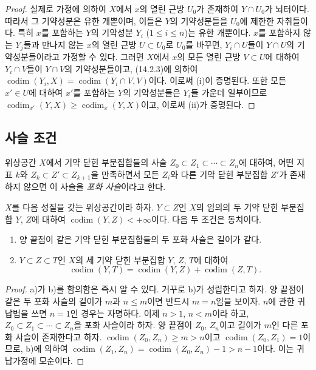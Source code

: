 \begin{proof}
실제로 가정에 의하여 $X$에서 $x$의 열린 근방 $U_0$가 존재하여
$Y\cap U_0$가 뇌터이다. 따라서 그 기약성분은 유한 개뿐이며, 이들은
$Y$의 기약성분들을 $U_0$에 제한한 자취들이다. 특히 $x$를 포함하는
$Y$의 기약성분 $Y_i$ ($1\leq i\leq n$)는 유한 개뿐이다. $x$를
포함하지 않는 $Y_j$들과 만나지 않는 $x$의 열린 근방
$U\subset U_0$로 $U_0$를 바꾸면, $Y_i\cap U$들이 $Y\cap U$의
기약성분들이라고 가정할 수 있다. 그러면 $X$에서 $x$의 모든 열린 근방
$V\subset U$에 대하여 $Y_i\cap V$들이 $Y\cap V$의 기약성분들이고,
(14.2.3)에 의하여
$\operatorname{codim}(Y_i,X)=\operatorname{codim}(Y_i\cap V,V)$이다.
이로써 (i)이 증명된다. 또한 모든 $x'\in U$에 대하여 $x'$를 포함하는
$Y$의 기약성분들은 $Y_i$들 가운데 일부이므로
$\operatorname{codim}_{x'}(Y,X)\geq\operatorname{codim}_x(Y,X)$이고,
이로써 (ii)가 증명된다.
\end{proof}

\subsection{사슬 조건}
\label{subsection:0.14.3-fr}

\begin{env}[14.3.1]
\label{0.14.3.1-fr}
위상공간 $X$에서 기약 닫힌 부분집합들의 사슬
$Z_0\subset Z_1\subset\cdots\subset Z_n$에 대하여, 어떤 지표 $k$와
$Z_k\subset Z'\subset Z_{k+1}$을 만족하면서 모든 $Z_i$와 다른 기약
닫힌 부분집합 $Z'$가 존재하지 않으면 이 사슬을 \emph{포화 사슬}이라고
한다.
\end{env}

\begin{proposition}[14.3.2]
\label{0.14.3.2-fr}
$X$를 다음 성질을 갖는 위상공간이라 하자. $Y\subset Z$인 $X$의 임의의
두 기약 닫힌 부분집합 $Y$, $Z$에 대하여
$\operatorname{codim}(Y,Z)<+\infty$이다. 다음 두 조건은 동치이다.
\begin{enumerate}
  \item[\rm(a)] 양 끝점이 같은 기약 닫힌 부분집합들의 두 포화 사슬은
  길이가 같다.
  \item[\rm(b)] $Y\subset Z\subset T$인 $X$의 세 기약 닫힌 부분집합
  $Y$, $Z$, $T$에 대하여
  \[
    \operatorname{codim}(Y,T)=
    \operatorname{codim}(Y,Z)+\operatorname{codim}(Z,T).
    \tag{14.3.2.1}\label{0.14.3.2.1-fr}
  \]
\end{enumerate}
\end{proposition}

\begin{proof}
a)가 b)를 함의함은 즉시 알 수 있다. 거꾸로 b)가 성립한다고 하자.
양 끝점이 같은 두 포화 사슬의 길이가 $m$과 $n\leq m$이면 반드시
$m=n$임을 보이자. $n$에 관한 귀납법을 쓰면 $n=1$인 경우는 자명하다.
이제 $n>1$, $n<m$이라 하고,
$Z_0\subset Z_1\subset\cdots\subset Z_n$을 포화 사슬이라 하자.
양 끝점이 $Z_0$, $Z_n$이고 길이가 $m$인 다른 포화 사슬이 존재한다고
하자. $\operatorname{codim}(Z_0,Z_n)\geq m>n$이고
$\operatorname{codim}(Z_0,Z_1)=1$이므로, b)에 의하여
$\operatorname{codim}(Z_1,Z_n)=\operatorname{codim}(Z_0,Z_n)-1>n-1$이다.
이는 귀납가정에 모순이다.
\end{proof}

